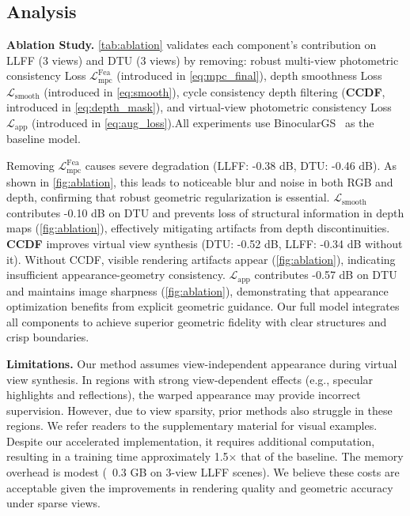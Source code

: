 \subsection{Analysis}

\noindent \textbf{Ablation Study.}  
\cref{tab:ablation} validates each component's contribution on LLFF (3 views) and DTU (3 views) by removing: robust multi-view photometric 
consistency Loss \textbf{$\mathcal{L}_{\text{mpc}}^{\text{Fea}}$} (introduced in \cref{eq:mpc_final}), depth smoothness Loss \textbf{$\mathcal{L}_{\text{smooth}} $} (introduced in \cref{eq:smooth}), cycle consistency depth filtering (\textbf{CCDF}, introduced in \cref{eq:depth_mask}), 
and virtual-view photometric consistency Loss \textbf{$\mathcal{L}_{\text{app}}$} (introduced in \cref{eq:aug_loss}).All experiments use BinocularGS~\cite{han2024binocular} as the baseline model.

Removing \textbf{$\mathcal{L}_{\text{mpc}}^{\text{Fea}}$} causes severe degradation 
(LLFF: -0.38 dB, DTU: -0.46 dB). 
As shown in \cref{fig:ablation}, this leads to noticeable blur and noise in both 
RGB and depth, confirming that robust geometric regularization is essential.
\textbf{$\mathcal{L}_{\text{smooth}}$} contributes -0.10 dB on DTU and prevents 
loss of structural information in depth maps (\cref{fig:ablation}), effectively 
mitigating artifacts from depth discontinuities.
\textbf{CCDF} improves virtual view synthesis (DTU: -0.52 dB, 
LLFF: -0.34 dB without it). 
Without CCDF, visible rendering artifacts appear (\cref{fig:ablation}), indicating 
insufficient appearance-geometry consistency.
\textbf{$\mathcal{L}_{\text{app}}$} contributes -0.57 dB on DTU and maintains image 
sharpness (\cref{fig:ablation}), demonstrating that appearance optimization benefits 
from explicit geometric guidance.
Our full model integrates all components to achieve superior geometric fidelity 
with clear structures and crisp boundaries.


\noindent \textbf{Limitations.}  
Our method assumes view-independent appearance during virtual view synthesis. 
In regions with strong view-dependent effects (e.g., specular highlights and 
reflections), the warped appearance may provide incorrect supervision.
However, due to view sparsity, prior methods also struggle in these regions. 
We refer readers to the supplementary material for visual examples.
Despite our accelerated implementation, it requires additional 
computation, resulting in a training time approximately 1.5× that of the baseline. 
The memory overhead is modest (~0.3 GB on 3-view LLFF scenes).
We believe these costs are acceptable given the improvements in 
rendering quality and geometric accuracy under sparse views.

